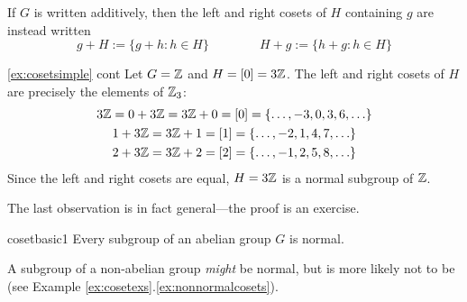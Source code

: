 If $G$ is written additively, then the left and right cosets of $H$ containing $g$ are instead written
\[
	g+H:=\{g+h:h\in H\}
	\qquad\qquad 
	H+g:=\{h+g:h\in H\}
\]

\begin{example*}{\ref{ex:cosetsimple} cont}{}
	Let $G=\mathbb{Z}$ and $H=[0]=3\mathbb{Z}$. The left and right cosets of $H$ are precisely the elements of $\mathbb{Z}_3$:
	\begin{gather*}
		3\mathbb{Z}=0+3\mathbb{Z}=3\mathbb{Z}+0=[0]=\{\ldots,-3,0,3,6,\ldots\}\\
		1+3\mathbb{Z}=3\mathbb{Z}+1=[1]=\{\ldots,-2,1,4,7,\ldots\}\\
		2+3\mathbb{Z}=3\mathbb{Z}+2=[2]=\{\ldots,-1,2,5,8,\ldots\}
	\end{gather*}
	Since the left and right cosets are equal, $H=3\mathbb{Z}$ is a normal subgroup of $\mathbb{Z}$.
\end{example*}

\goodbreak

The last observation is in fact general---the proof is an exercise.

\begin{lemm}{}{cosetbasic1}
	Every subgroup of an abelian group $G$ is normal.
\end{lemm}


A subgroup of a non-abelian group \emph{might} be normal, but is more likely not to be (see Example \ref*{ex:cosetexs}.\ref{ex:nonnormalcosets}).


